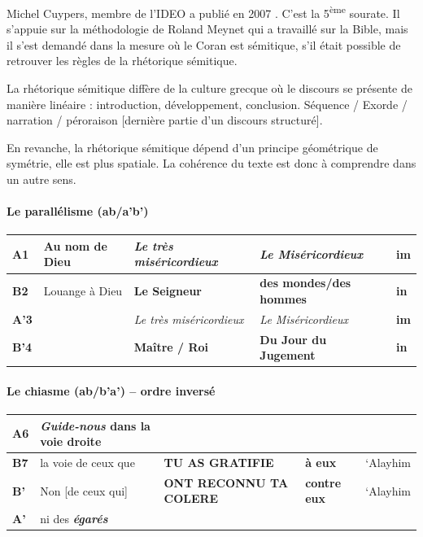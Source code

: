 Michel Cuypers, membre de l'IDEO a publié en 2007 . C'est la
5\textsuperscript{ème} sourate. Il s'appuie sur la méthodologie de
Roland Meynet qui a travaillé sur la Bible, mais il s'est demandé dans
la mesure où le Coran est sémitique, s'il était possible de retrouver
les règles de la rhétorique sémitique.

La rhétorique sémitique diffère de la culture grecque où le discours se
présente de manière linéaire : introduction, développement, conclusion.
Séquence / Exorde / narration / péroraison {[}dernière partie d'un
discours structuré{]}.

En revanche, la rhétorique sémitique dépend d'un principe géométrique de
symétrie, elle est plus spatiale. La cohérence du texte est donc à
comprendre dans un autre sens.

\paragraph{Le parallélisme (ab/a'b')}

\begin{longtable}[]{@{}lllll@{}}
\toprule
\textbf{A1} & Au nom de Dieu & \emph{Le très miséricordieux} & \emph{Le
Miséricordieux} & \textbf{im} \\
\midrule
\endhead
\textbf{B2} & Louange à Dieu & \textbf{Le Seigneur} & \textbf{des
mondes/des hommes} & \textbf{in} \\
\textbf{A'3} & & \emph{Le très miséricordieux} & \emph{Le
Miséricordieux} & \textbf{im} \\
\textbf{B'4} & & \textbf{Maître / Roi} & \textbf{Du Jour du Jugement} &
\textbf{in} \\
\bottomrule
\end{longtable}

\paragraph{Le chiasme (ab/b'a') -- ordre inversé}

\begin{longtable}[]{@{}lllll@{}}
\toprule
\textbf{A6} & \emph{\textbf{Guide-nous}} dans la voie droite & & & \\
\midrule
\endhead
\textbf{B7} & la voie de ceux que & \textbf{TU AS GRATIFIE} & \textbf{à
eux} & `Alayhim \\
\textbf{B'} & Non {[}de ceux qui{]} & \textbf{ONT RECONNU TA COLERE} &
\textbf{contre eux} & `Alayhim \\
\textbf{A'} & ni des \emph{\textbf{égarés}} & & & \\
\bottomrule
\end{longtable}

